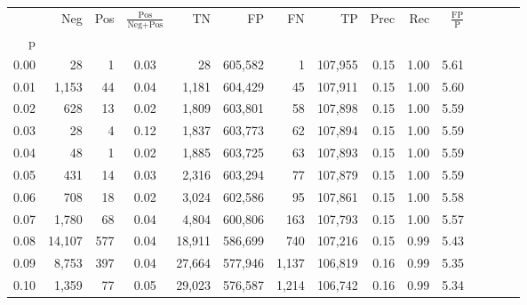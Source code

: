 \begin{tabular}{rrrcrrrrrrrrrrr}
\toprule
{} &     Neg &    Pos & $\frac{\text{Pos}}{\text{Neg}+\text{Pos}}$ &       TN &       FP &       FN &       TP &  Prec &   Rec & $\frac{\text{FP}}{\text{P}}$ \\
p    &         &        &                                            &          &          &          &          &       &       &                              \\
\midrule
0.00 &      28 &      1 &                                       0.03 &       28 &  605,582 &        1 &  107,955 &  0.15 &  1.00 &                         5.61 \\
0.01 &   1,153 &     44 &                                       0.04 &    1,181 &  604,429 &       45 &  107,911 &  0.15 &  1.00 &                         5.60 \\
0.02 &     628 &     13 &                                       0.02 &    1,809 &  603,801 &       58 &  107,898 &  0.15 &  1.00 &                         5.59 \\
0.03 &      28 &      4 &                                       0.12 &    1,837 &  603,773 &       62 &  107,894 &  0.15 &  1.00 &                         5.59 \\
0.04 &      48 &      1 &                                       0.02 &    1,885 &  603,725 &       63 &  107,893 &  0.15 &  1.00 &                         5.59 \\
0.05 &     431 &     14 &                                       0.03 &    2,316 &  603,294 &       77 &  107,879 &  0.15 &  1.00 &                         5.59 \\
0.06 &     708 &     18 &                                       0.02 &    3,024 &  602,586 &       95 &  107,861 &  0.15 &  1.00 &                         5.58 \\
0.07 &   1,780 &     68 &                                       0.04 &    4,804 &  600,806 &      163 &  107,793 &  0.15 &  1.00 &                         5.57 \\
0.08 &  14,107 &    577 &                                       0.04 &   18,911 &  586,699 &      740 &  107,216 &  0.15 &  0.99 &                         5.43 \\
0.09 &   8,753 &    397 &                                       0.04 &   27,664 &  577,946 &    1,137 &  106,819 &  0.16 &  0.99 &                         5.35 \\
0.10 &   1,359 &     77 &                                       0.05 &   29,023 &  576,587 &    1,214 &  106,742 &  0.16 &  0.99 &                         5.34 \\

\end{tabular}
